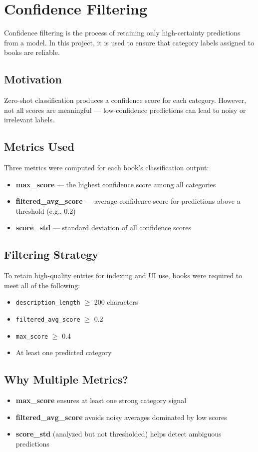 \chapter{Confidence Filtering}
\label{appendix:confidence-filtering}

Confidence filtering is the process of retaining only high-certainty predictions from a model. In this project, it is used to ensure that category labels assigned to books are reliable.

\section*{Motivation}
Zero-shot classification produces a confidence score for each category. However, not all scores are meaningful — low-confidence predictions can lead to noisy or irrelevant labels.

\section*{Metrics Used}
Three metrics were computed for each book's classification output:

\begin{itemize}
  \item \textbf{max\_score} — the highest confidence score among all categories
  \item \textbf{filtered\_avg\_score} — average confidence score for predictions above a threshold (e.g., 0.2)
  \item \textbf{score\_std} — standard deviation of all confidence scores
\end{itemize}

\section*{Filtering Strategy}
To retain high-quality entries for indexing and UI use, books were required to meet all of the following:

\begin{itemize}
  \item \texttt{description\_length} $\geq$ 200 characters
  \item \texttt{filtered\_avg\_score} $\geq$ 0.2
  \item \texttt{max\_score} $\geq$ 0.4
  \item At least one predicted category
\end{itemize}

\section*{Why Multiple Metrics?}
\begin{itemize}
  \item \textbf{max\_score} ensures at least one strong category signal
  \item \textbf{filtered\_avg\_score} avoids noisy averages dominated by low scores
  \item \textbf{score\_std} (analyzed but not thresholded) helps detect ambiguous predictions
\end{itemize}

